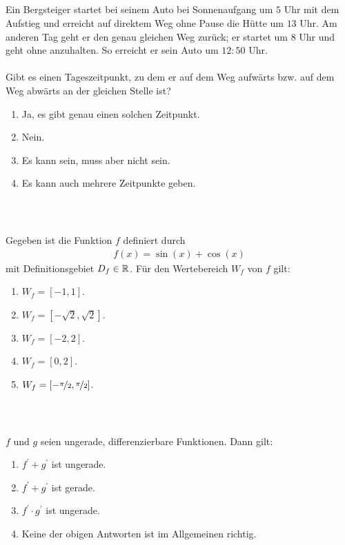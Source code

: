 \subsection*{}
Ein Bergsteiger startet bei seinem Auto bei Sonnenaufgang um $ 5 $ Uhr mit dem Aufstieg und erreicht auf direktem Weg ohne Pause die Hütte um $ 13 $ Uhr.
Am anderen Tag geht er den genau gleichen Weg zurück; er startet um $ 8 $ Uhr und geht ohne anzuhalten. So erreicht er sein Auto um $ 12:50 $ Uhr.\\
\\
Gibt es einen Tageszeitpunkt, zu dem er auf dem Weg aufwärts bzw. auf dem Weg abwärts an der gleichen Stelle ist? 
\renewcommand{\labelenumi}{(\alph{enumi})}
\begin{enumerate}
	\item 
	Ja, es gibt genau einen solchen Zeitpunkt.
	\item 
	Nein.
	\item
	Es kann sein, muss aber nicht sein.
	\item
	Es kann auch mehrere Zeitpunkte geben.
\end{enumerate}
\ \\
\subsection*{}
Gegeben ist die Funktion $ f $ definiert durch
\begin{align*}
	f(x) = \sin(x) + \cos(x)
\end{align*}
mit Definitionsgebiet $ D_f \in \mathbb{R} $. Für den Wertebereich $ W_f $ von $ f $ gilt:
\renewcommand{\labelenumi}{(\alph{enumi})}
\begin{enumerate}
\item 
$ W_f = [-1,1] $.
\item
$ W_f = [-\sqrt{2},\sqrt{2}] $.
\item
$ W_f = [-2,2] $.
\item
$ W_f = [0,2] $.
\item
$ W_f = [-\nicefrac{\pi }{2}, \nicefrac{\pi }{2}] $.
\end{enumerate}
\ \\
\subsection*{}
$ f $ und $ g $ seien ungerade, differenzierbare Funktionen. Dann gilt:
\renewcommand{\labelenumi}{(\alph{enumi})}
\begin{enumerate}
	\item 
	$ f^\prime + g^\prime $ ist ungerade.
	\item
	$ f^\prime + g^\prime $ ist gerade.
	\item
	$ f^\prime \cdot g^\prime $ ist ungerade.
	\item
	Keine der obigen Antworten ist im Allgemeinen richtig.
\end{enumerate}
\ \\
